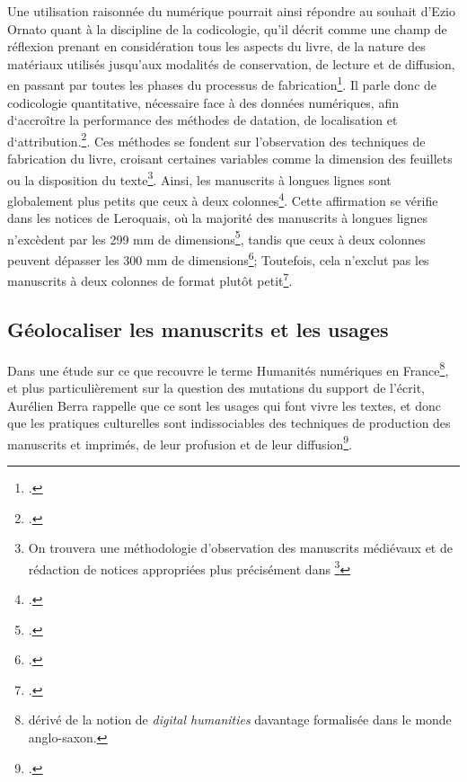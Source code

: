 \documentclass[a4paper,12pt,twoside]{book}
\begin{document}
	Une utilisation raisonnée du numérique pourrait ainsi répondre au souhait d'Ezio Ornato quant à la discipline de la codicologie, qu'il décrit comme une champ de réflexion prenant en considération tous les aspects du livre, de \og la nature des matériaux utilisés jusqu’aux modalités de conservation, de lecture et de diffusion, en passant par toutes les phases du processus de fabrication\fg{}\footcite[p. vii]{livre_medie}. Il parle donc de codicologie quantitative, nécessaire face à des données numériques, afin d‘accroître la performance des méthodes de datation, de localisation et d‘attribution.\footcite[p. 41-47]{livre_medie}. Ces méthodes se fondent sur l'observation des techniques de fabrication du livre, croisant certaines variables comme la dimension des feuillets ou la disposition du texte\footnote{On trouvera une méthodologie d'observation des manuscrits médiévaux et de rédaction de notices appropriées plus précisément dans \footcite{initiation_man_lit}}. Ainsi, les manuscrits à longues lignes sont globalement plus petits que ceux à deux colonnes\footcite[p. 51]{livre_medie}. Cette affirmation se vérifie dans les notices de Leroquais, où la majorité des manuscrits à longues lignes n'excèdent par les 299 mm de dimensions\footcite[Notice 145, p. 305]{Leroquais_notices}, tandis que ceux à deux colonnes peuvent dépasser les 300 mm de dimensions\footcite[Notice 5, p. 9]{Leroquais_notices}; Toutefois, cela n'exclut pas les manuscrits à deux colonnes de format plutôt petit\footcite[Notice 62, p. 150]{Leroquais_notices}. 
	
	\subsection{Géolocaliser les manuscrits et les usages}
	
	Dans une étude sur ce que recouvre le terme \og Humanités numériques\fg{} en France\footnote{dérivé de la notion de \textit{digital humanities} davantage formalisée dans le monde anglo-saxon.}, et plus particulièrement sur la question des mutations du support de l'écrit, Aurélien Berra rappelle que ce sont les usages qui font vivre les textes, et donc que les pratiques culturelles sont indissociables des techniques de production des manuscrits et imprimés, de leur profusion et de leur diffusion\footcite{Faire_HN}. 
	
\end{document}

